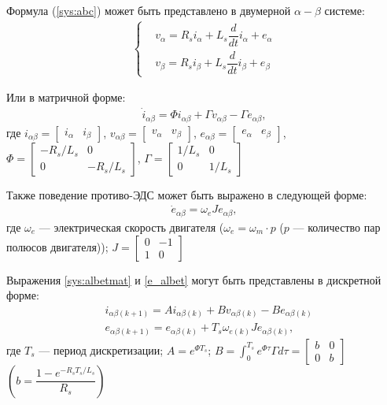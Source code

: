 Формула (\ref{sys:abc}) может быть представлено в двумерной $\alpha-\beta$ системе:
\begin{align}
\label{sys:albet}
\left\{ \begin{aligned} 
  &v_{\alpha}=R_si_{\alpha}+L_s\dfrac{d}{dt}i_{\alpha}+e_{\alpha}\\
  &v_{\beta}=R_si_{\beta}+L_s\dfrac{d}{dt}i_{\beta}+e_{\beta}
\end{aligned} \right.
\end{align}

Или в матричной форме: \cite{art:smo}
\begin{align}
\label{sys:albetmat}
\dot{i}_{\alpha\beta}=\Phi i_{\alpha\beta}+\Gamma v_{\alpha\beta}-\Gamma e_{\alpha\beta},
\end{align}где $i_{\alpha\beta}=\begin{bmatrix}
	i_{\alpha} & i_{\beta}
\end{bmatrix}$, $v_{\alpha\beta}=\begin{bmatrix}
	v_{\alpha} & v_{\beta}
\end{bmatrix}$, $e_{\alpha\beta}=\begin{bmatrix}
	e_{\alpha} & e_{\beta}
\end{bmatrix}$, $\Phi=\begin{bmatrix}
	-R_s/L_s & 0 \\
	0 & -R_s/L_s
\end{bmatrix}$, $\Gamma = \begin{bmatrix}
	1/L_s & 0 \\
	0 & 1/L_s
\end{bmatrix}$

Также поведение противо-ЭДС может быть выражено в следующей форме:
\begin{align}
\label{e_albet}
	\dot{e}_{\alpha\beta}=\omega_eJe_{\alpha\beta},
\end{align}где $\omega_e$ --- электрическая скорость двигателя ($\omega_e=\omega_m\cdot p$ ($p$ --- количество пар полюсов двигателя)); $J=\begin{bmatrix}
 0 & -1 \\
 1 & 0
\end{bmatrix}$

Выражения \ref{sys:albetmat} и \ref{e_albet} могут быть представлены в дискретной форме: \cite{art:smo}
\begin{align}
\label{eq:hat_i}
	&i_{\alpha\beta(k+1)}=Ai_{\alpha\beta(k)}+Bv_{\alpha\beta(k)}-Be_{\alpha\beta(k)}\\
	\label{eq:hat_e}
	&e_{\alpha\beta(k+1)}=e_{\alpha\beta(k)}+T_s\omega_{e(k)}Je_{\alpha\beta(k)},
\end{align}где $T_s$ --- период дискретизации; $A=e^{\Phi T_s}$; $B=\int_0^{T_s}e^{\Phi\tau}\Gamma d\tau=\begin{bmatrix}
	b & 0 \\
	0 & b
\end{bmatrix}$ $\left(b=\dfrac{1-e^{-R_sT_s/L_s}}{R_s}\right)$

